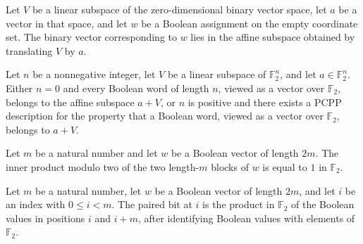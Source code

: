 \begin{theorem}
\label{FABL.isBoolAffineSubspace_zero}
\leanok
{}
Let $V$ be a linear subspace of the zero-dimensional binary vector space, let $a$ be a
vector in that space, and let $w$ be a Boolean assignment on the empty coordinate set.
The binary vector corresponding to $w$ lies in the affine subspace obtained by
translating $V$ by $a$.
\end{theorem}

\begin{theorem}
\label{FABL.affineSubspacePCPPDescription_or_zero}
\leanok
{}
Let $n$ be a nonnegative integer, let $V$ be a linear subspace of $\mathbb F_2^n$, and
let $a\in\mathbb F_2^n$. Either $n=0$ and every Boolean word of length $n$, viewed as a
vector over $\mathbb F_2$, belongs to the affine subspace $a+V$, or $n$ is positive and
there exists a PCPP description for the property that a Boolean word, viewed as a vector
over $\mathbb F_2$, belongs to $a+V$.
\end{theorem}

\begin{definition}
\label{FABL.IsInnerProductModTwoOne}
\leanok
{}
Let $m$ be a natural number and let $w$ be a Boolean vector of length $2m$. The inner
product modulo two of the two length-$m$ blocks of $w$ is equal to $1$ in
$\mathbb{F}_2$.
\end{definition}

\begin{definition}
\label{FABL.innerProductPairBit}
\leanok
{}
Let $m$ be a natural number, let $w$ be a Boolean vector of length $2m$, and let $i$ be
an index with $0\le i<m$. The paired bit at $i$ is the product in $\mathbb{F}_2$ of the
Boolean values in positions $i$ and $i+m$, after identifying Boolean values with
elements of $\mathbb{F}_2$.
\end{definition}

